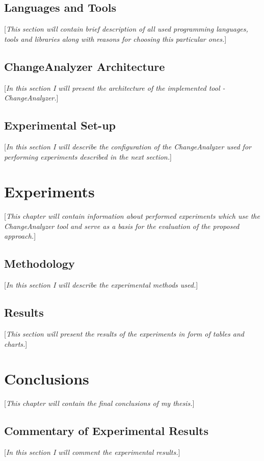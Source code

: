 \documentclass{pracamgr}
\begin{document}
\section{Languages and Tools}
[\textit{This section will contain brief description of all used programming languages, tools and libraries along with reasons for choosing this particular ones.}]

\section{ChangeAnalyzer Architecture}
[\textit{In this section I will present the architecture of the implemented tool - ChangeAnalyzer.}]

\section{Experimental Set-up}
[\textit{In this section I will describe the configuration of the ChangeAnalyzer used for performing experiments described in the next section.}]

\chapter{Experiments}
[\textit{This chapter will contain information about performed experiments which use the ChangeAnalyzer tool and serve as a basis for the evaluation of the proposed approach.}]

\section{Methodology}
[\textit{In this section I will describe the experimental methods used.}]

\section{Results}
[\textit{This section will present the results of the experiments in form of tables and charts.}]

\chapter{Conclusions}
[\textit{This chapter will contain the final conclusions of my thesis.}]

\section{Commentary of Experimental Results}
[\textit{In this section I will comment the experimental results.}]
\end{document}
